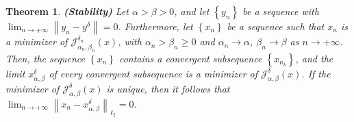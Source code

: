\documentclass[a4paper,12pt]{article}
\newtheorem{theorem}{Theorem}[section]
\numberwithin{equation}{section}
\begin{document}
\begin{theorem}\label{the3.2}
    \textbf{(Stability)} Let $\alpha>\beta> 0$, and let $\left\{y_{n}\right\}$ be a sequence with $\lim_{n\rightarrow +\infty}\left\|y_{n}-y^{\delta}\right\|=0$. Furthermore, let $\left\{x_{n}\right\}$ be a sequence such that $x_{n}$ is a minimizer of $\mathcal{J}_{\alpha_{n},\beta_{n}}^{\delta_{n}}\left(x\right)$, with $\alpha_{n}>\beta_{n}\geq 0$ and $\alpha_{n}\rightarrow \alpha$, $\beta_{n}\rightarrow \beta$ as $n\rightarrow +\infty$. Then, the sequence $\left\{x_{n}\right\}$ contains a convergent subsequence $\left\{x_{n_{k}}\right\}$, and the limit $x_{\alpha,\beta}^{\delta}$ of every convergent subsequence is a minimizer of $\mathcal{J}_{\alpha,\beta}^{\delta}(x)$. If the minimizer of $\mathcal{J}_{\alpha,\beta}^{\delta}(x)$ is unique, then it follows that $\lim_{n\rightarrow +\infty}\left\|x_{n}- x_{\alpha,\beta}^{\delta}\right\|_{\ell_{2}}=0$.
\end{theorem}
\end{document}
